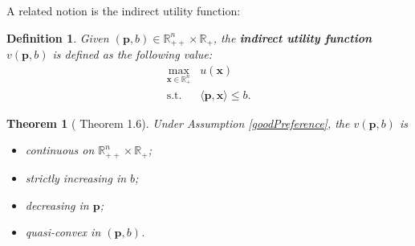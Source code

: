 \documentclass[openany]{book}
\newtheorem{definition}{Definition}[chapter]
\newtheorem{theorem}{Theorem}[chapter]
\theoremstyle{remark}
\begin{document}
A related notion is the indirect utility function:
\begin{definition}\label{indirectUtility}
    Given $(\boldsymbol{p},b)\in \mathbb{R}_{++}^n\times \mathbb{R}_+$, the \textbf{indirect utility function} $v(\boldsymbol{p},b)$ is defined as the following value:
    \begin{equation}
        \begin{array}{rl}
            \displaystyle\max_{\boldsymbol{x}\in \mathbb{R}_+^n} & u(\boldsymbol{x}) \\
            \mathrm{s.t.} & \langle \boldsymbol{p},\boldsymbol{x}\rangle\le b.
        \end{array}
    \end{equation}
\end{definition}
\begin{theorem}[\cite{J01} Theorem 1.6]
    Under Assumption \ref{goodPreference}, the $v(\boldsymbol{p},b)$ is
    \begin{itemize}
        \item continuous on $\mathbb{R}_{++}^n\times \mathbb{R}_+$;
        \item strictly increasing in $b$;
        \item decreasing in $\boldsymbol{p}$;
        \item quasi-convex in $(\boldsymbol{p},b)$.
    \end{itemize}
\end{theorem}
\end{document}
